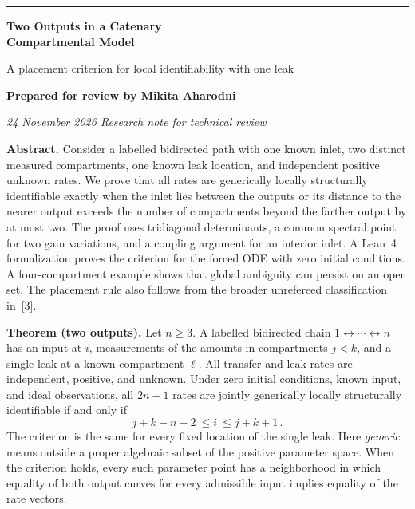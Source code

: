 \documentclass[11pt,a4paper]{article}
\begin{document}
\thispagestyle{plain}
{\color{inkblue}\rule{\textwidth}{1pt}}\par
\vspace{0.65em}
{\raggedright\LARGE\bfseries Two Outputs in a Catenary\\[0.1em] Compartmental Model\par}
\vspace{0.35em}
{\large A placement criterion for local identifiability with one leak\par}
\vspace{1em}
{\bfseries Prepared for review by Mikita Aharodni}\par
{\small\itshape 24 November 2026 \quad\textbullet\quad Research note for technical review}\par
\vspace{0.8em}
\textbf{Abstract.}
Consider a labelled bidirected path with one known inlet, two distinct measured compartments, one known leak location, and independent positive unknown rates. We prove that all rates are generically locally structurally identifiable exactly when the inlet lies between the outputs or its distance to the nearer output exceeds the number of compartments beyond the farther output by at most two. The proof uses tridiagonal determinants, a common spectral point for two gain variations, and a coupling argument for an interior inlet. A Lean~4 formalization proves the criterion for the forced ODE with zero initial conditions. A four-compartment example shows that global ambiguity can persist on an open set. The placement rule also follows from the broader unrefereed classification in~[3].
\vspace{0.6em}
\par
\noindent\textbf{Theorem (two outputs).}
Let \(n\ge3\). A labelled bidirected chain \(1\leftrightarrow\cdots\leftrightarrow n\) has an input at \(i\), measurements of the amounts in compartments \(j<k\), and a single leak at a known compartment \(\ell\). All transfer and leak rates are independent, positive, and unknown. Under zero initial conditions, known input, and ideal observations, all \(2n-1\) rates are jointly generically locally structurally identifiable if and only if
\begin{equation}
                   \boxed{j+k-n-2\ \le i\ \le j+k+1}\,. \label{eq:criterion}
\end{equation}
The criterion is the same for every fixed location of the single leak. Here \emph{generic} means outside a proper algebraic subset of the positive parameter space. When the criterion holds, every such parameter point has a neighborhood in which equality of both output curves for every admissible input implies equality of the rate vectors.
\end{document}
